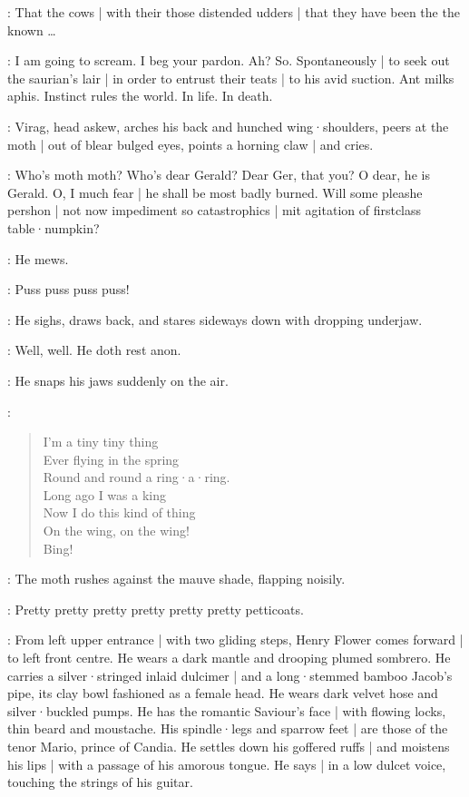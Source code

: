\Virag:
That the cows |
with their those distended udders |
that they have been the the known \ldots

\Bloom:
I am going to scream.
I beg your pardon.
Ah?
So.
Spontaneously |
to seek out the saurian's lair |
in order to entrust their teats |
to his avid suction.
Ant milks aphis.
Instinct rules the world.
In life.
In death.

:
Virag,
head askew,
arches his back and hunched wing·shoulders,
peers at the moth |
out of blear bulged eyes,
points a horning claw |
and cries.

\Virag:
Who's moth moth?
Who's dear Gerald?
Dear Ger,
that you?
O dear,
he is Gerald.
O,
I much fear |
he shall be most badly burned.
Will some pleashe pershon |
not now impediment so catastrophics |
mit agitation of firstclass table·numpkin?

:
He mews.

\Virag:
Puss puss puss puss!

:
He sighs,
draws back,
and stares sideways down with dropping underjaw.

\Virag:
Well,
well.
He doth rest anon.

:
He snaps his jaws suddenly on the air.

\Moth[2]:
\begin{verse}
    I'm a tiny tiny thing\\
%
    Ever flying in the spring\\
    Round and round a ring·a·ring.\\
    Long ago I was a king\\
    Now I do this kind of thing\\
    On the wing, on the wing!\\
    Bing!
\end{verse}

:
The moth rushes against the mauve shade,
flapping noisily.

\Moth:
Pretty pretty pretty pretty pretty pretty petticoats.

:
From left upper entrance |
with two gliding steps,
Henry Flower comes forward |
to left front centre.
He wears a dark mantle and drooping plumed sombrero.
He carries a silver·stringed inlaid dulcimer |
and a long·stemmed bamboo Jacob's pipe,
its clay bowl fashioned as a female head.
He wears dark velvet hose and silver·buckled pumps.
He has the romantic Saviour's face |
with flowing locks,
thin beard and moustache.
His spindle·legs and sparrow feet |
are those of the tenor Mario,
prince of Candia.
He settles down his goffered ruffs |
and moistens his lips |
with a passage of his amorous tongue.
He says |
in a low dulcet voice,
touching the strings of his guitar.

